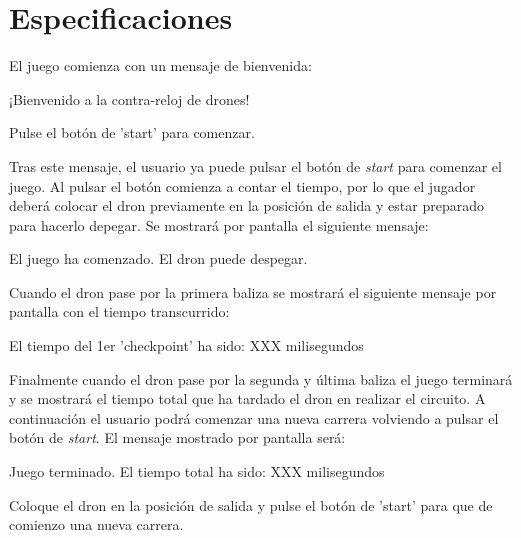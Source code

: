 \section{Especificaciones}
El juego comienza con un mensaje de bienvenida:
    \begin{description}
    		\item \hspace{10mm} ¡Bienvenido a la contra-reloj de drones!  
    		\item \hspace{10mm} Pulse el botón de 'start' para comenzar.
	\end{description}

Tras este mensaje, el usuario ya puede pulsar el botón de \textit{start} para comenzar el juego. Al pulsar el botón comienza a contar el tiempo, por lo que el jugador deberá colocar el dron previamente en la posición de salida y estar preparado para hacerlo depegar. Se mostrará por pantalla el siguiente mensaje:

    \begin{description}
    		\item \hspace{10mm} El juego ha comenzado. El dron puede despegar.
	\end{description}

Cuando el dron pase por la primera baliza se mostrará el siguiente mensaje por pantalla con el tiempo transcurrido:
    \begin{description}
    		\item \hspace{10mm} El tiempo del 1er 'checkpoint' ha sido: XXX milisegundos
	\end{description}
	
Finalmente cuando el dron pase por la segunda y última baliza el juego terminará y se mostrará el tiempo total que ha tardado el dron en realizar el circuito. A continuación el usuario podrá comenzar una nueva carrera volviendo a pulsar el botón de \textit{start}. El mensaje mostrado por pantalla será:

    \begin{description}
    		\item \hspace{10mm} Juego terminado. El tiempo total ha sido: XXX milisegundos
    		\item \hspace{10mm} Coloque el dron en la posición de salida y pulse el botón de 'start' para que de comienzo una nueva carrera.
	\end{description}	
